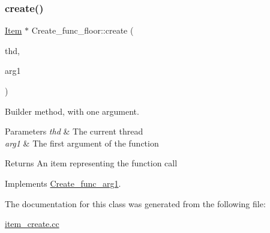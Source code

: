 \subsubsection{\texorpdfstring{create()}{create()}}
{\footnotesize\ttfamily \mbox{\hyperlink{classItem}{Item}} $\ast$ Create\+\_\+func\+\_\+floor\+::create (\begin{DoxyParamCaption}\item[{T\+HD $\ast$}]{thd,  }\item[{\mbox{\hyperlink{classItem}{Item}} $\ast$}]{arg1 }\end{DoxyParamCaption})\hspace{0.3cm}{\ttfamily [virtual]}}

Builder method, with one argument. 
\begin{DoxyParams}{Parameters}
{\em thd} & The current thread \\
\hline
{\em arg1} & The first argument of the function \\
\hline
\end{DoxyParams}
\begin{DoxyReturn}{Returns}
An item representing the function call 
\end{DoxyReturn}


Implements \mbox{\hyperlink{classCreate__func__arg1_a3e9a98f755cd82c3e762e334c955a8c9}{Create\+\_\+func\+\_\+arg1}}.



The documentation for this class was generated from the following file\+:\begin{DoxyCompactItemize}
\item 
\mbox{\hyperlink{item__create_8cc}{item\+\_\+create.\+cc}}\end{DoxyCompactItemize}
